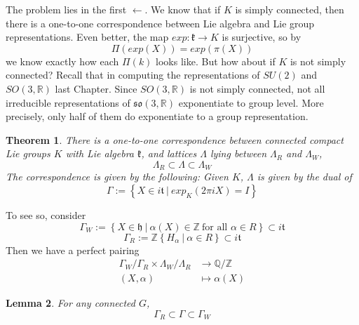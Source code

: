 \documentclass[11pt]{article}
\newtheorem{theorem}{Theorem}[section]
\newtheorem{lemma}[theorem]{Lemma}
\newcommand{\bb}[1]{\mathbb{#1}}
\newcommand{\mf}[1]{\mathfrak{#1}}
\begin{document}
\noindent The problem lies in the first $\leftarrow$. We know that if $K$ is simply connected, then there is a one-to-one correspondence between Lie algebra and Lie group representations. Even better, the map $exp: \mf{k} \to K$ is surjective, so by
$$\Pi(exp(X)) = exp(\pi(X))$$
we know exactly how each $\Pi(k)$ looks like. But how about if $K$ is not simply connected? Recall that in computing the representations of $SU(2)$ and $SO(3,\bb{R})$ last Chapter. Since $SO(3,\bb{R})$ is not simply connected, not all irreducible representations of $\mf{so}(3,\bb{R})$ exponentiate to group level. More precisely, only half of them do exponentiate to a group representation.\\
\begin{theorem}
There is a one-to-one correspondence between connected compact Lie groups $K$ with Lie algebra $\mf{k}$, and lattices $\Lambda$ lying between $\Lambda_R$ and $\Lambda_W$,
$$\Lambda_R \subset \Lambda \subset \Lambda_W$$
The correspondence is given by the following: Given $K$, $\Lambda$ is given by the dual of
$$\Gamma := \left\{ X \in i \mf{t}\ \Big|\ exp_K(2\pi iX) = I\right\}$$
\end{theorem}
To see so, consider
$$\Gamma_W := \left\{X \in \mf{h}\ \Big|\ \alpha(X) \in \bb{Z}\ \text{for all } \alpha \in R\right\} \subset i\mf{t}$$
$$\Gamma_R := \bb{Z}\left\{H_{\alpha}\ \Big|\ \alpha \in R\right\} \subset i\mf{t}$$
Then we have a perfect pairing
\begin{align*}
\Gamma_W/\Gamma_R \times \Lambda_W/\Lambda_R &\to \bb{Q}/\bb{Z}\\
(X, \alpha) &\mapsto \alpha(X)
\end{align*}
\begin{lemma}
For any connected $G$,
$$\Gamma_R \subset \Gamma \subset \Gamma_W$$
\end{lemma}
\end{document}
